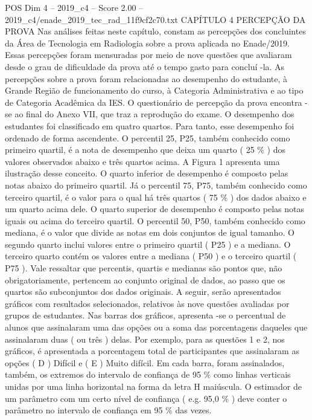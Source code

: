 \begin{textsample}{POS Dim 4 – 2019\_c4 – Score 2.00 – 2019\_c4/enade\_2019\_tec\_rad\_11f9cf2c70.txt}  \label{ex:f4_pos_118}
CAPÍTULO 4 PERCEPÇÃO DA PROVA Nas análises feitas neste capítulo, constam as percepções dos concluintes da Área de Tecnologia em Radiologia sobre a prova aplicada no Enade/2019.
Essas percepções foram mensuradas por meio de nove questões que avaliaram desde o grau de dificuldade da prova até o tempo gasto para concluí -la.
As percepções sobre a prova foram relacionadas ao desempenho do estudante, à Grande Região de funcionamento do curso, à Categoria Administrativa e ao tipo de Categoria Acadêmica da IES.
O questionário de percepção da prova encontra -se ao final do Anexo VII, que traz a reprodução do exame.
O desempenho dos estudantes foi classificado em quatro quartos.
Para tanto, esse desempenho foi ordenado de forma ascendente.
O percentil 25, P25, também conhecido como primeiro quartil, é a nota de desempenho que deixa um quarto ( 25 \% ) dos valores observados abaixo e três quartos acima.
A Figura 1 apresenta uma ilustração desse conceito.
O quarto inferior de desempenho é composto pelas notas abaixo do primeiro quartil.
Já o percentil 75, P75, também conhecido como terceiro quartil, é o valor para o qual há três quartos ( 75 \% ) dos dados abaixo e um quarto acima dele.
O quarto superior de desempenho é composto pelas notas iguais ou acima do terceiro quartil.
O percentil 50, P50, também conhecido como mediana, é o valor que divide as notas em dois conjuntos de igual tamanho.
O segundo quarto inclui valores entre o primeiro quartil ( P25 ) e a mediana.
O terceiro quarto contém os valores entre a mediana ( P50 ) e o terceiro quartil ( P75 ).
Vale ressaltar que percentis, quartis e medianas são pontos que, não obrigatoriamente, pertencem ao conjunto original de dados, ao passo que os quartos são subconjuntos dos dados originais.
A seguir, serão apresentados gráficos com resultados selecionados, relativos às nove questões avaliadas por grupos de estudantes.
Nas barras dos gráficos, apresenta -se o percentual de alunos que assinalaram uma das opções ou a soma das porcentagens daqueles que assinalaram duas ( ou três ) delas.
Por exemplo, para as questões 1 e 2, nos gráficos, é apresentada a porcentagem total de participantes que assinalaram as opções ( D ) Difícil e ( E ) Muito difícil.
Em cada barra, foram assinalados, também, os extremos do intervalo de confiança de 95 \% como linhas verticais unidas por uma linha horizontal na forma da letra H maiúscula.
O estimador de um parâmetro com um certo nível de confiança ( e.g. 95,0 \% ) deve conter o parâmetro no intervalo de confiança em 95 \% das vezes.

\end{textsample}
